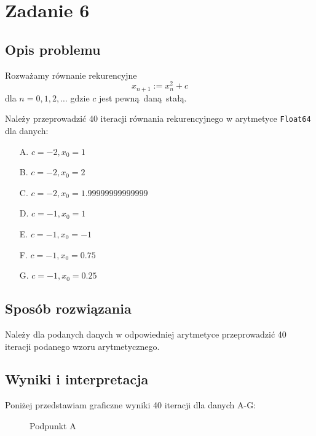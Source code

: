 \documentclass{article}
\begin{document}
\section*{Zadanie 6}
\subsection*{Opis problemu}
Rozważamy równanie rekurencyjne
\[   
    {x_{n+1} := x_n^2 + c}
\] 
dla $n = 0,1,2,\dots$ gdzie $c$ jest pewną daną stałą.

Należy przeprowadzić 40 iteracji równania rekurencyjnego w arytmetyce \texttt{Float64} dla danych:
\begin{enumerate}\label{6.podpunkty}
     \item[A.] $c = -2, x_0 = 1$
    \item[B.] $c = -2, x_0 = 2$
    \item[C.] $c = -2, x_0 = 1.99999999999999$
    \item[D.] $c = -1, x_0 = 1$
    \item[E.] $c = -1, x_0 = -1$
    \item[F.] $c = -1, x_0 = 0.75$
    \item[G.] $c = -1, x_0 = 0.25$
\end{enumerate}


\subsection*{Sposób rozwiązania} 

Należy dla podanych danych w odpowiedniej arytmetyce przeprowadzić 40 iteracji podanego wzoru arytmetycznego.
\subsection*{Wyniki i interpretacja}

Poniżej przedstawiam graficzne wyniki 40 iteracji dla danych A-G:
\begin{figure}[H]
\centering
{}
\caption{Podpunkt A}
\end{figure}
\end{document}
